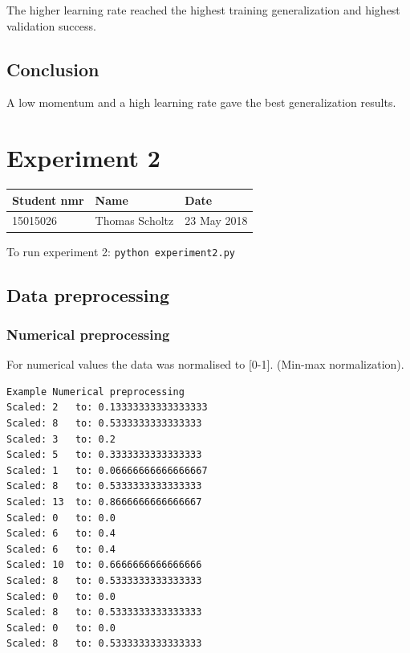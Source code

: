 \documentclass[11pt]{article}
\begin{document}
The higher learning rate reached the highest training generalization and
highest validation success.

\hypertarget{conclusion}{%
\subsection{Conclusion}\label{conclusion}}

A low momentum and a high learning rate gave the best generalization
results.

    \hypertarget{experiment-2}{%
\section{Experiment 2}\label{experiment-2}}

\begin{longtable}[]{@{}lll@{}}
\toprule
Student nmr & Name & Date\tabularnewline
\midrule
\endhead
15015026 & Thomas Scholtz & 23 May 2018\tabularnewline
\bottomrule
\end{longtable}

To run experiment 2: \texttt{python\ experiment2.py}

    \hypertarget{data-preprocessing}{%
\subsection{Data preprocessing}\label{data-preprocessing}}

\hypertarget{numerical-preprocessing}{%
\subsubsection{Numerical preprocessing}\label{numerical-preprocessing}}

For numerical values the data was normalised to {[}0-1{]}. (Min-max
normalization).

\begin{verbatim}
Example Numerical preprocessing
Scaled: 2   to: 0.13333333333333333
Scaled: 8   to: 0.5333333333333333
Scaled: 3   to: 0.2
Scaled: 5   to: 0.3333333333333333
Scaled: 1   to: 0.06666666666666667
Scaled: 8   to: 0.5333333333333333
Scaled: 13  to: 0.8666666666666667
Scaled: 0   to: 0.0
Scaled: 6   to: 0.4
Scaled: 6   to: 0.4
Scaled: 10  to: 0.6666666666666666
Scaled: 8   to: 0.5333333333333333
Scaled: 0   to: 0.0
Scaled: 8   to: 0.5333333333333333
Scaled: 0   to: 0.0
Scaled: 8   to: 0.5333333333333333
\end{verbatim}
\end{document}
